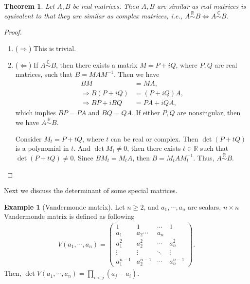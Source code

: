 \documentclass[10pt]{book}
\newtheorem{theorem}{Theorem}[chapter]
\theoremstyle{definition}
\newtheorem{example}{Example}[chapter]
\numberwithin{equation}{chapter}
\begin{document}
\medskip

\begin{theorem}
Let $A,B$ be real matrices. Then $A,B$ are similar as real matrices is equivalent to that they are similar as complex matrices, i.e., $A \overset{\mathbb{R}}{\sim} B\iff A \overset{\mathbb{C}}{\sim} B$.
\end{theorem}
\begin{proof}
~\begin{enumerate}[label=(\arabic*)]
    \item ($\Rightarrow$) This is trivial.
    \item ($\Leftarrow$) If $A \overset{\mathbb{C}}{\sim} B$, then there exists a matrix $M = P + iQ$, where $P,Q$ are real matrices, such that $B = MAM^{-1}$. Then we have
    \begin{align*}
        BM & = MA, \\
        \Rightarrow B(P + iQ) & = (P + iQ)A, \\
        \Rightarrow BP + i BQ & = PA + i QA,
    \end{align*}
    which implies $BP=PA$ and $BQ = QA$. If either $P,Q$ are nonsingular, then we have $A \overset{\mathbb{R}}{\sim} B$.
    
    Consider $M_t = P + tQ$, where $t$ can be real or complex. Then $\det (P+tQ)$ is a polynomial in $t$. And $\det M_i \neq 0$, then there exists $t\in\mathbb{R}$ such that $\det (P+tQ)\neq 0$. Since $BM_t = M_t A$, then $B = M_t A M_t^{-1}$. Thus, $A \overset{\mathbb{R}}{\sim} B$.
\end{enumerate}
\end{proof}

\medskip

Next we discuss the determinant of some special matrices.

\begin{example}[Vandermonde matrix]
Let $n\geq 2$, and $a_1, \cdots, a_n$ are scalars, $n\times n$ Vandermonde matrix is defined as following
\begin{align*}
    V(a_1,\cdots,a_n) = \left(\begin{matrix}
        1 & 1 & \cdots & 1\\
        a_1 & a_2 \cdots & a_n \\
        a_1^2 & a_2^2 & \cdots & a_n^2 \\
        \vdots & \vdots & \ddots & \vdots \\
        a_1^{n-1} & a_2^{n-1} & \cdots & a_n^{n-1}
    \end{matrix}\right).
\end{align*}
Then, $\det V(a_1,\cdots,a_n) = \prod_{i < j}(a_j - a_i)$.
\end{example}
\end{document}
